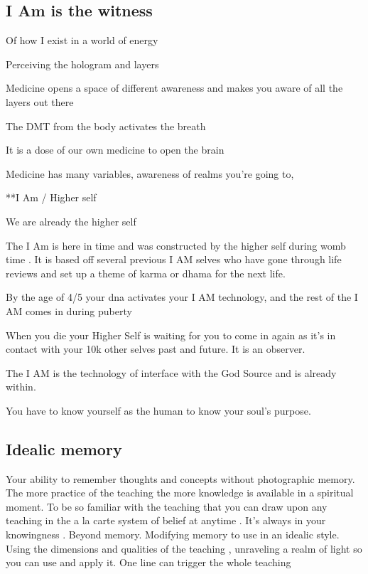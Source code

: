\subsection{I Am is the witness}\label{i-am-is-the-witness}

Of how I exist in a world of energy

Perceiving the hologram and layers

Medicine opens a space of different awareness and makes you aware of all
the layers out there

The DMT from the body activates the breath

It is a dose of our own medicine to open the brain

Medicine has many variables, awareness of realms you're going to,

**I Am / Higher self

We are already the higher self

The I Am is here in time and was constructed by the higher self during
womb time . It is based off several previous I AM selves who have gone
through life reviews and set up a theme of karma or dhama for the next
life.

By the age of 4/5 your dna activates your I AM technology, and the rest
of the I AM comes in during puberty

When you die your Higher Self is waiting for you to come in again as
it's in contact with your 10k other selves past and future. It is an
observer.

The I AM is the technology of interface with the God Source and is
already within.

You have to know yourself as the human to know your soul's purpose.

\subsection{Idealic memory}\label{idealic-memory}

Your ability to remember thoughts and concepts without photographic
memory. The more practice of the teaching the more knowledge is
available in a spiritual moment. To be so familiar with the teaching
that you can draw upon any teaching in the a la carte system of belief
at anytime . It's always in your knowingness . Beyond memory. Modifying
memory to use in an idealic style. Using the dimensions and qualities of
the teaching , unraveling a realm of light so you can use and apply it.
One line can trigger the whole teaching

